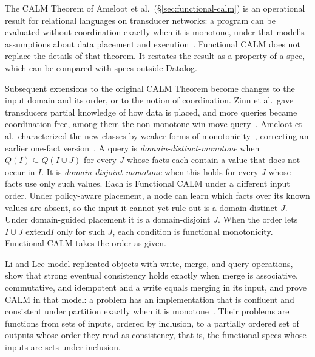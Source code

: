 \documentclass[sigconf]{cidr-2027}
\theoremstyle{remark}
\newcommand{\inrelbase}{extend\xspace}       %
\begin{document}
\color{blue!70!black}The CALM Theorem of Ameloot et al.\ (\S\ref{sec:functional-calm}) is an
operational result for relational languages on transducer networks: a program
can be evaluated without coordination exactly when it is monotone, under that
model's assumptions about data placement and
execution~\cite{ameloot2013relational,ameloot2015weaker}.  Functional CALM
does not replace the details of that theorem.  It restates the result as a
property of a spec, which can be compared with specs outside Datalog.\color{black}

Subsequent extensions to the original CALM Theorem become changes to the input
domain and its order, or to the notion of coordination.  Zinn et al.\ gave transducers partial knowledge of how data is
placed, and more queries became coordination-free, among them the
non-monotone win-move query~\cite{zinn2012winmove}.  Ameloot et al.\
characterized the new classes by weaker forms of
monotonicity~\cite{ameloot2015weaker}, correcting an earlier one-fact
version~\cite{zinn2012weak}.  A query is \emph{domain-distinct-monotone} when
$Q(I)\subseteq Q(I\cup J)$ for every $J$ whose facts each contain a value
that does not occur in $I$.  It is \emph{domain-disjoint-monotone} when this
holds for every $J$ whose facts use only such values.  Each is Functional
CALM under a different input order.  Under policy-aware placement, a node can
learn which facts over its known values are absent, so the input it cannot
yet rule out is a domain-distinct $J$.  Under domain-guided placement it is a
domain-disjoint $J$.  When the order lets $I\cup J$ \inrelbase $I$ only for
such $J$, each condition is functional monotonicity.  Functional CALM takes
the order as given.

Li and Lee model replicated objects with write, merge, and query operations,
show that strong eventual consistency holds exactly when merge is associative,
commutative, and idempotent and a write equals merging in its input, and prove
CALM in that model: a problem has an implementation that is confluent and
consistent under partition exactly when it is monotone~\cite{li2025coordinationfree}.
Their problems are functions from sets of inputs, ordered by inclusion, to a
partially ordered set of outputs whose order they read as consistency, that is,
the functional specs whose inputs are sets under inclusion.
\end{document}
